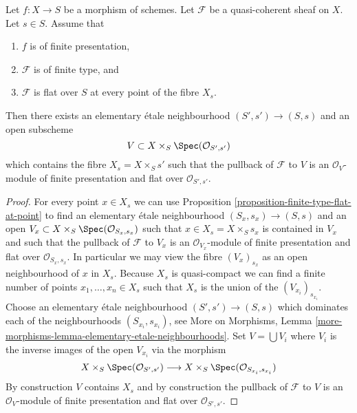 \begin{lemma}
\label{lemma-finite-type-flat-along-fibre}
Let $f : X \to S$ be a morphism of schemes.
Let $\mathcal{F}$ be a quasi-coherent sheaf on $X$.
Let $s \in S$.
Assume that
\begin{enumerate}
\item $f$ is of finite presentation,
\item $\mathcal{F}$ is of finite type, and
\item $\mathcal{F}$ is flat over $S$ at every point of the fibre $X_s$.
\end{enumerate}
Then there exists an elementary \'etale neighbourhood $(S', s') \to (S, s)$
and an open subscheme
$$
V \subset X \times_S \Spec(\mathcal{O}_{S', s'})
$$
which contains the fibre $X_s = X \times_S s'$ such that the pullback
of $\mathcal{F}$ to $V$ is an $\mathcal{O}_V$-module
of finite presentation and flat over $\mathcal{O}_{S', s'}$.
\end{lemma}

\begin{proof}
For every point $x \in X_s$ we can use
Proposition \ref{proposition-finite-type-flat-at-point}
to find an elementary \'etale neighbourhood $(S_x, s_x) \to (S, s)$
and an open $V_x \subset X \times_S \Spec(\mathcal{O}_{S_x, s_x})$
such that $x \in X_s = X \times_S s_x$ is contained in $V_x$ and such that
the pullback of $\mathcal{F}$ to $V_x$ is an
$\mathcal{O}_{V_x}$-module of finite presentation and flat over
$\mathcal{O}_{S_x, s_x}$. In particular we may view the fibre
$(V_x)_{s_x}$ as an open neighbourhood of $x$ in $X_s$.
Because $X_s$ is quasi-compact we can find a finite number of points
$x_1, \ldots, x_n \in X_s$ such that $X_s$ is the union of
the $(V_{x_i})_{s_{x_i}}$. Choose an elementary \'etale neighbourhood
$(S' , s') \to (S, s)$ which dominates each of the neighbourhoods
$(S_{x_i}, s_{x_i})$, see
More on Morphisms,
Lemma \ref{more-morphisms-lemma-elementary-etale-neighbourhoods}.
Set $V = \bigcup V_i$ where $V_i$ is the inverse images of the open
$V_{x_i}$ via the morphism
$$
X \times_S \Spec(\mathcal{O}_{S', s'})
\longrightarrow
X \times_S \Spec(\mathcal{O}_{S_{x_i}, s_{x_i}})
$$
By construction $V$ contains $X_s$ and by construction the pullback
of $\mathcal{F}$ to $V$ is an $\mathcal{O}_V$-module
of finite presentation and flat over $\mathcal{O}_{S', s'}$.
\end{proof}

